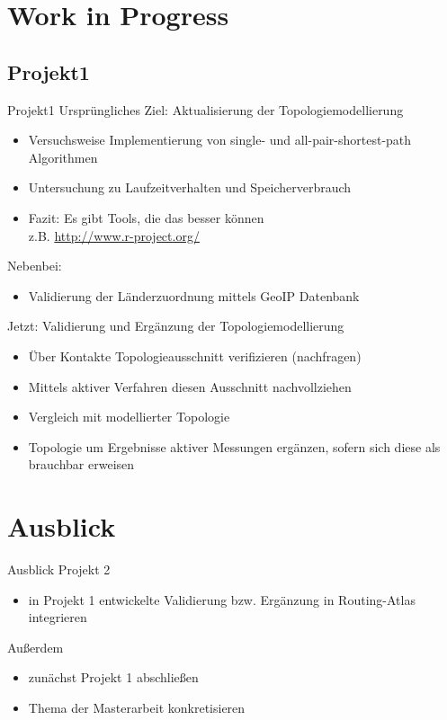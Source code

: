 \documentclass[ngerman,compress,hyperref={bookmarks}]{beamer}
\begin{document}
\section{Work in Progress}
\subsection{Projekt1}
\begin{frame}[allowframebreaks]{Projekt1}
  Ursprüngliches Ziel: Aktualisierung der Topologiemodellierung
  \begin{itemize}
    \item Versuchsweise Implementierung von single- und all-pair-shortest-path Algorithmen
    \item Untersuchung zu Laufzeitverhalten und Speicherverbrauch
    \item Fazit: Es gibt Tools, die das besser können\\
    \hspace{0.3cm}z.B. \url{http://www.r-project.org/}
  \end{itemize}
  Nebenbei:
  \begin{itemize}
    \item Validierung der Länderzuordnung mittels GeoIP Datenbank
  \end{itemize}
  \framebreak

  Jetzt: Validierung und Ergänzung der Topologiemodellierung
  \begin{itemize}
    \item Über Kontakte Topologieausschnitt verifizieren (nachfragen)
    \item Mittels aktiver Verfahren diesen Ausschnitt nachvollziehen
    \item Vergleich mit modellierter Topologie
    \item Topologie um Ergebnisse aktiver Messungen ergänzen, sofern sich diese als brauchbar erweisen
  \end{itemize}
\end{frame}


\section{Ausblick}
\begin{frame}{Ausblick}
  Projekt 2
  \begin{itemize}
    \item in Projekt 1 entwickelte Validierung bzw. Ergänzung in Routing-Atlas integrieren
  \end{itemize}
  \vspace{0.3cm}
  Außerdem
  \begin{itemize}
    \item zunächst Projekt 1 abschließen
    \item Thema der Masterarbeit konkretisieren
  \end{itemize}
\end{frame}
\end{document}
